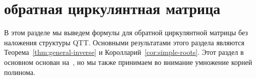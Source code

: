 


\section{обратная циркулянтная матрица} \label{sec:circ}

В этом разделе мы выведем формулы для обратной циркулянтной матрицы без наложения структуры QTT.
Основными результатами этого раздела являются Теорема~\ref{thm:general-inverse} и Королларий~\ref{cor:simple-roots}.
Этот раздел в основном основан на~\cite{fuyong2011inverse}, но мы также принимаем во внимание умножение корней полинома.

